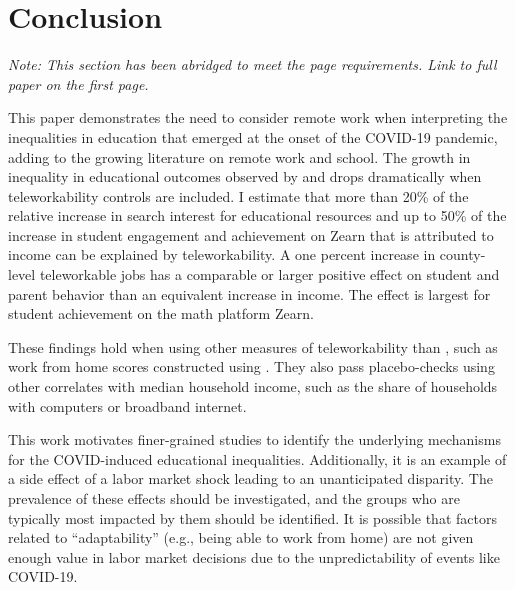 \section{Conclusion} \label{sec:conclusion}
\if{}
{\small
    \textit{Note: This section has been abridged to meet the page requirements. Link to full paper on the first page.}
}
\fi

This paper demonstrates the need to consider remote work when interpreting the inequalities in education that emerged at the onset of the COVID-19 pandemic, adding to the growing literature on remote work and school.
The growth in inequality in educational outcomes observed by \cite{bh1} and \cite{chetty} drops dramatically when teleworkability controls are included.
I estimate that more than 20\% of the relative increase in search interest for educational resources and up to 50\% of the increase in student engagement and achievement on Zearn that is attributed to income can be explained by teleworkability.
A one percent increase in county-level teleworkable jobs has a comparable or larger positive effect on student and parent behavior than an equivalent increase in income.
The effect is largest for student achievement on the math platform Zearn.

These findings hold when using other measures of teleworkability than \cite{dingel}, such as work from home scores constructed using \cite{mongey}.
They also pass placebo-checks using other correlates with median household income, such as
the share of households with computers or broadband internet.

This work motivates finer-grained studies to identify the underlying mechanisms for the COVID-induced educational inequalities.
Additionally, it is an example of a side effect of a labor market shock leading to an unanticipated disparity.
The prevalence of these effects should be investigated, and the groups who are typically most impacted by them should be identified.
It is possible that factors related to ``adaptability'' (e.g., being able to work from home) are not given enough value in labor market decisions due to the unpredictability of events like COVID-19.

